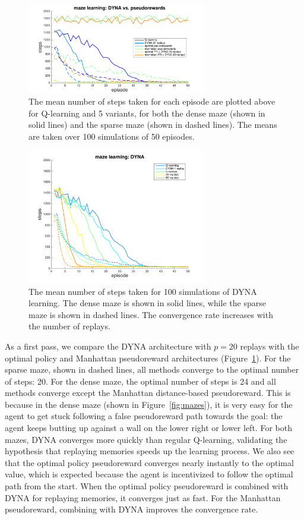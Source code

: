 \documentclass[notitlepage]{article}
\begin{document}
\begin{figure}[ht]
\centering
\includegraphics[width=0.7\textwidth]{modelCompareNoNoise}
\caption{The mean number of steps taken for each episode are plotted above for Q-learning and 5 variants, for both the dense maze (shown in solid lines) and the sparse maze (shown in dashed lines). The means are taken over 100 simulations of 50 episodes.}
\label{fig:model-compare}
\end{figure}

\begin{figure}[!ht]
\centering
\includegraphics[width=0.7\textwidth]{DYNAcompare.png}
\caption{The mean number of steps taken for 100 simulations of DYNA learning. The dense maze is shown in solid lines, while the sparse maze is shown in dashed lines. The convergence rate increases with the number of replays.}
\label{fig:dyna-compare}
\end{figure}

As a first pass, we compare the DYNA architecture with $p =20$ replays with the optimal policy and Manhattan pseudoreward architectures (Figure~\ref{fig:model-compare}). For the sparse maze, shown in dashed lines, all methods converge to the optimal number of steps: 20. For the dense maze, the optimal number of steps is 24 and all methods converge except the Manhattan distance-based pseudoreward. This is because in the dense maze (shown in Figure~\ref{fig:mazes}), it is very easy for the agent to get stuck following a false pseudoreward path towards the goal: the agent keeps butting up against a wall on the lower right or lower left. For both mazes, DYNA converges more quickly than regular Q-learning, validating the hypothesis that replaying memories speeds up the learning process. We also see that the optimal policy pseudoreward converges nearly instantly to the optimal value, which is expected because the agent is incentivized to follow the optimal path from the start. When the optimal policy pseudoreward is combined with DYNA for replaying memories, it converges just as fast. For the Manhattan pseudoreward, combining with DYNA improves the convergence rate. 
\end{document}
